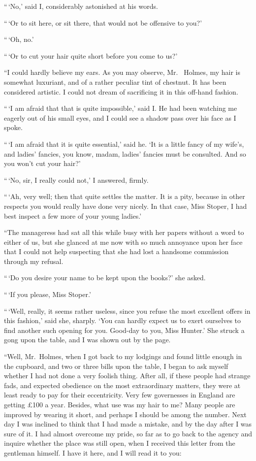 “\,‘No,’ said I, considerably astonished at his words.

“\,‘Or to sit here, or sit there, that would not be offensive
to you?’

“\,‘Oh, no.’

“\,‘Or to cut your hair quite short before you come to us?’

“I could hardly believe my ears. As you may observe, Mr.\ %
Holmes, my hair is somewhat luxuriant, and of a rather peculiar
tint of chestnut. It has been considered artistic. I could
not dream of sacrificing it in this off-hand fashion.

“\,‘I am afraid that that is quite impossible,’ said I. He
had been watching me eagerly out of his small eyes, and I
could see a shadow pass over his face as I spoke.

“\,‘I am afraid that it is quite essential,’ said he. ‘It is a
little fancy of my wife’s, and ladies’ fancies, you know, madam,
ladies’ fancies must be consulted. And so you won’t cut your
hair?’

“\,‘No, sir, I really could not,’ I answered, firmly.

“\,‘Ah, very well; then that quite settles the matter. It is
a pity, because in other respects you would really have done
very nicely. In that case, Miss Stoper, I had best inspect a
few more of your young ladies.’

“The manageress had sat all this while busy with her
papers without a word to either of us, but she glanced at me
now with so much annoyance upon her face that I could not
help suspecting that she had lost a handsome commission
through my refusal.

“\,‘Do you desire your name to be kept upon the books?’
she asked.

“\,‘If you please, Miss Stoper.’

“\,‘Well, really, it seems rather useless, since you refuse the
most excellent offers in this fashion,’ said she, sharply. ‘You
can hardly expect us to exert ourselves to find another such
opening for you. Good-day to you, Miss Hunter.’ She struck
a gong upon the table, and I was shown out by the page.

“Well, Mr.~Holmes, when I got back to my lodgings and
found little enough in the cupboard, and two or three bills
upon the table, I began to ask myself whether I had not done
a very foolish thing. After all, if these people had strange
fads, and expected obedience on the most extraordinary matters,
they were at least ready to pay for their eccentricity.
Very few governesses in England are getting £100 a year.
Besides, what use was my hair to me? Many people are improved
by wearing it short, and perhaps I should be among
the number. Next day I was inclined to think that I had
made a mistake, and by the day after I was sure of it. I had
almost overcome my pride, so far as to go back to the agency
and inquire whether the place was still open, when I received
this letter from the gentleman himself. I have it here, and I
will read it to you:

